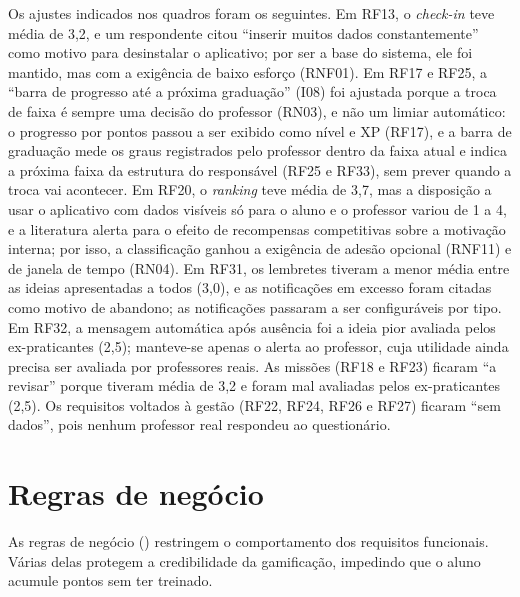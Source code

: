 Os ajustes indicados nos quadros foram os seguintes. Em RF13, o
\textit{check-in} teve média de 3,2, e um respondente citou ``inserir muitos
dados constantemente'' como motivo para desinstalar o aplicativo; por ser a
base do sistema, ele foi mantido, mas com a exigência de baixo esforço
(RNF01). Em RF17 e RF25, a ``barra de progresso até a próxima graduação''
(I08) foi ajustada porque a troca de faixa é sempre uma decisão do
professor (RN03), e não um limiar automático: o progresso por pontos
passou a ser exibido como nível e XP (RF17), e a barra de graduação mede
os graus registrados pelo professor dentro da faixa atual e indica a
próxima faixa da estrutura do responsável (RF25 e RF33), sem prever
quando a troca vai acontecer. Em RF20, o \textit{ranking} teve média de 3,7, mas a
disposição a usar o aplicativo com dados visíveis só para o aluno e o
professor variou de 1 a 4, e a literatura alerta para o efeito de
recompensas competitivas sobre a motivação interna; por isso, a
classificação ganhou a exigência de adesão opcional (RNF11) e de janela de
tempo (RN04). Em RF31, os lembretes tiveram a menor média entre as ideias
apresentadas a todos (3,0), e as notificações em excesso foram citadas
como motivo de abandono; as notificações passaram a ser configuráveis por
tipo. Em RF32, a mensagem automática após ausência foi a ideia pior
avaliada pelos ex-praticantes (2,5); manteve-se apenas o alerta ao
professor, cuja utilidade ainda precisa ser avaliada por professores
reais. As missões (RF18 e RF23) ficaram ``a revisar'' porque tiveram média
de 3,2 e foram mal avaliadas pelos ex-praticantes (2,5). Os requisitos
voltados à gestão (RF22, RF24, RF26 e RF27) ficaram ``sem dados'', pois
nenhum professor real respondeu ao questionário.

\section{Regras de negócio}
\label{sec:rn}

As regras de negócio () restringem o comportamento dos
requisitos funcionais. Várias delas protegem a credibilidade da
gamificação, impedindo que o aluno acumule pontos sem ter treinado.

